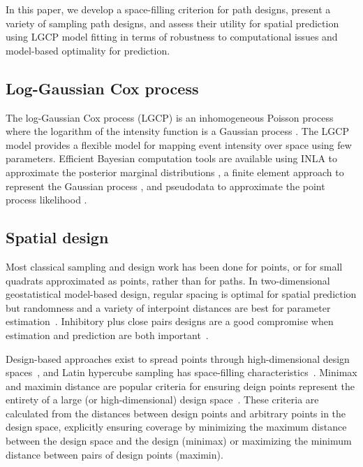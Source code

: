 \documentclass[review]{elsarticle}
\begin{document}
In this paper, we develop a space-filling criterion for path designs, present
a variety of sampling path designs, and assess their utility for spatial
prediction using LGCP model fitting in terms of robustness to computational
issues and model-based optimality for prediction.


\subsection{Log-Gaussian Cox process}

The log-Gaussian Cox process (LGCP) is an inhomogeneous Poisson process where
the logarithm of the intensity function is a Gaussian process
\citep{moelleretal}. The LGCP model provides a flexible model for mapping event
intensity over space using few parameters. Efficient Bayesian computation tools
are available using INLA to approximate the posterior marginal distributions
\citep{rueetal}, a finite element approach to represent the Gaussian process
\citep{lindgrenetal}, and pseudodata to approximate the point process
likelihood \citep{simpsonetal}.


\subsection{Spatial design}

Most classical sampling and design work has been done for points, or for small
quadrats approximated as points, rather than for paths. In two-dimensional
geostatistical model-based design, regular spacing is optimal for spatial
prediction but randomness and a variety of interpoint distances are best for
parameter estimation~\citep{diggle}. Inhibitory plus close pairs designs are a
good compromise when estimation and prediction are both
important~\citep{chipetaetal2017}.

Design-based approaches exist to spread points through high-dimensional design
spaces~\citep{borkowskipiepel}, and Latin hypercube sampling has space-filling
characteristics~\citep{mckayetal,husslageetal}. Minimax and maximin distance
are popular criteria for ensuring deign points represent the entirety of a
large (or high-dimensional) design space~\citep{johnson}. These criteria
are calculated from the distances between design points and arbitrary
points in the design space, explicitly ensuring coverage by minimizing the
maximum distance between the design space and the design (minimax) or
maximizing the minimum distance between pairs of design points (maximin).
\end{document}

